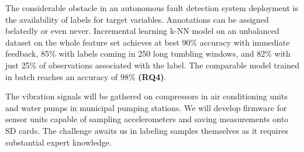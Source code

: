 The considerable obstacle in an autonomous fault detection system deployment is the availability of labels for target variables. Annotations can be assigned belatedly or even never. Incremental learning k-NN model on an unbalanced dataset on the whole feature set achieves at best 90\% accuracy with immediate feedback, 85\% with labels coming in 250 long tumbling windows, and 82\% with just 25\% of observations associated with the label. The comparable model trained in batch reaches an accuracy of 98\% \textbf{(RQ4)}.

The vibration signals will be gathered on compressors in air conditioning units and water pumps in municipal pumping stations. We will develop firmware for sensor units capable of sampling accelerometers and saving measurements onto SD cards. The challenge awaits us in labeling samples themselves as it requires substantial expert knowledge. 


